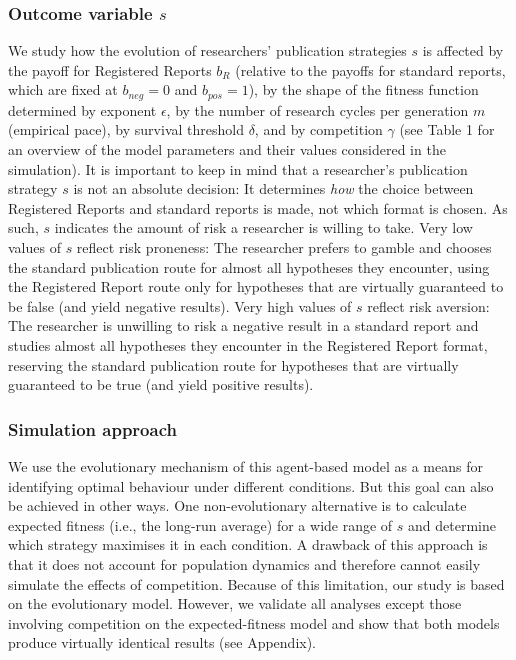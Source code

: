 \documentclass[
  british,
  a4paper,
  ,man,mask,floatsintext]{apa6}
\begin{document}
\subsubsection{\texorpdfstring{Outcome variable \(s\)}{Outcome variable s}}\label{outcome-variable-s}

We study how the evolution of researchers' publication strategies \(s\) is affected by the payoff for Registered Reports \(b_{R}\) (relative to the payoffs for standard reports, which are fixed at \(b_{neg} = 0\) and \(b_{pos} = 1\)), by the shape of the fitness function determined by exponent \(\epsilon\), by the number of research cycles per generation \(m\) (empirical pace), by survival threshold \(\delta\), and by competition \(\gamma\) (see Table 1 for an overview of the model parameters and their values considered in the simulation).
It is important to keep in mind that a researcher's publication strategy \(s\) is
not an absolute decision:
It determines \emph{how} the choice between Registered Reports and standard reports is made, not which format is chosen.
As such, \(s\) indicates the amount of risk a researcher is willing to take.
Very low values of \(s\) reflect risk proneness:
The researcher prefers to gamble and chooses the standard publication route for almost all hypotheses they encounter, using the Registered Report route only for hypotheses that are virtually guaranteed to be false (and yield negative results).
Very high values of \(s\) reflect risk aversion:
The researcher is unwilling to risk a negative result in a standard report and studies almost all hypotheses they encounter in the Registered Report format, reserving the standard publication route for hypotheses that are virtually guaranteed to be true (and yield positive results).

\subsubsection{Simulation approach}\label{simulation-approach}

We use the evolutionary mechanism of this agent-based model as a means for identifying optimal behaviour under different conditions.
But this goal can also be achieved in other ways.
One non-evolutionary alternative is to calculate expected fitness (i.e., the long-run average) for a wide range of \(s\) and determine which strategy maximises it in each condition.
A drawback of this approach is that it does not account for population dynamics and therefore cannot easily simulate the effects of competition.
Because of this limitation, our study is based on the evolutionary model.
However, we validate all analyses except those involving competition on the expected-fitness model and show that both models produce virtually identical results (see Appendix).
\end{document}
